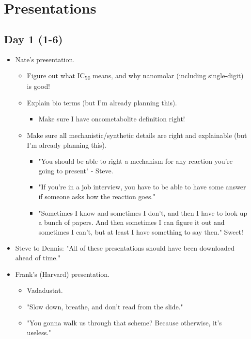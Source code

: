 \documentclass[../notes.tex]{subfiles}
\begin{document}
\chapter{Presentations}
\section{Day 1 (1-6)}
\begin{itemize}
    \item {}Nate's presentation.
    \begin{itemize}
        \item Figure out what IC\textsubscript{50} means, and why nanomolar (including single-digit) is good!
        \item Explain bio terms (but I'm already planning this).
        \begin{itemize}
            \item Make sure I have oncometabolite definition right!
        \end{itemize}
        \item Make sure all mechanistic/synthetic details are right and explainable (but I'm already planning this).
        \begin{itemize}
            \item "You should be able to right a mechanism for any reaction you're going to present" - Steve.
            \item "If you're in a job interview, you have to be able to have some answer if someone asks how the reaction goes."
            \item "Sometimes I know and sometimes I don't, and then I have to look up a bunch of papers. And then sometimes I can figure it out and sometimes I can't, but at least I have something to say then." Sweet!
        \end{itemize}
    \end{itemize}
    \item Steve to Dennis: "All of these presentations should have been downloaded ahead of time."
    \item Frank's (Harvard) presentation.
    \begin{itemize}
        \item Vadadustat.
        \item "Slow down, breathe, and don't read from the slide."
        \item "You gonna walk us through that scheme? Because otherwise, it's useless."
        \begin{itemize}

\end{itemize}
\end{itemize}
\end{itemize}
\end{document}
